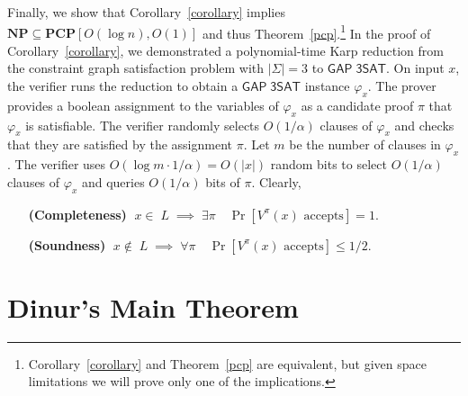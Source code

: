 \documentclass{article}
\newcommand{\bits}{\{0,1\}}
\newcommand{\class}[1]{\mathbf{#1}}
\newcommand{\NP}{\class{NP}}
\newcommand{\PCP}{\class{PCP}}
\newcommand{\GAPSAT}{\mathsf{GAP\;3SAT}}
\begin{document}
Finally, we show that Corollary~\ref{corollary} implies $\NP \subseteq \PCP[O(\log n),O(1)]$
and thus Theorem~\ref{pcp}.\footnote{
Corollary~\ref{corollary} and Theorem~\ref{pcp} are equivalent, but given space limitations
we will prove only one of the implications.}
In the proof of Corollary~\ref{corollary}, we demonstrated a polynomial-time
Karp reduction from the constraint graph satisfaction problem with
$|\Sigma| = 3$ to $\GAPSAT$.
On input $x$, the verifier runs the reduction  to obtain a $\GAPSAT$
instance $\varphi_x$.
The prover provides %
a boolean assignment to the variables of $\varphi_x$ as a candidate proof $\pi$
that $\varphi_x$ is satisfiable.
The verifier randomly selects $O(1/\alpha)$ clauses of $\varphi_x$ and
checks that they are satisfied by the assignment $\pi$.
Let $m$ be the number of clauses in $\varphi_x$.
The verifier uses $O(\log m \cdot 1/\alpha) = O(|x|)$ random bits
to select $O(1/\alpha)$ clauses of $\varphi_x$ and queries
$O(1/\alpha)$ bits of $\pi$.
Clearly,
\begin{itemize}[leftmargin=10em]
\item[\textbf{(Completeness)}] $\;x \in\; L \;\implies\; \exists \pi \quad \Pr[V^\pi(x) \text{ accepts}] = 1$.
\item[\textbf{(Soundness)}] $\;x \notin\; L \;\implies\; \forall \pi \quad \Pr[V^\pi(x) \text{ accepts}] \le 1/2$.
\end{itemize}


\section{Dinur's Main Theorem}\label{proof}

%
\end{document}
